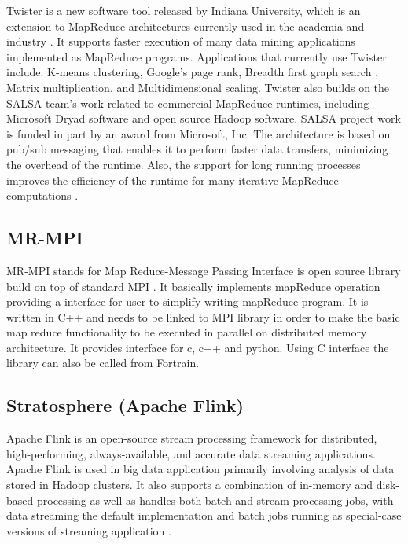      Twister is a new software tool released by Indiana University,
     which is an extension to MapReduce architectures currently used
     in the academia and industry \cite{www-twister1}. It supports
     faster execution of many data mining applications implemented as
     MapReduce programs. Applications that currently use Twister
     include: K-means clustering, Google's page rank, Breadth first
     graph search , Matrix multiplication, and Multidimensional
     scaling. Twister also builds on the SALSA team's work related to
     commercial MapReduce runtimes, including Microsoft Dryad software
     and open source Hadoop software. SALSA project work is funded in
     part by an award from Microsoft, Inc. The architecture is based
     on pub/sub messaging that enables it to perform faster data
     transfers, minimizing the overhead of the runtime. Also, the
     support for long running processes improves the efficiency of the
     runtime for many iterative MapReduce
     computations \cite{www-twister2} \cite{www-twister3}
     \cite{paper-twister}.

     \pv

\subsection{MR-MPI}

     MR-MPI stands for Map Reduce-Message
     Passing Interface is open source library build on top of standard
     MPI \cite{www-mapreducempi}. It basically implements
     mapReduce operation providing a
     interface for user to simplify writing mapReduce program.  It is
     written in C++ and needs to be linked to MPI library in order to
     make the basic map reduce functionality to be executed in
     parallel on distributed memory architecture.  It provides
     interface for c, c++ and python. Using C interface the library
     can also be called from Fortrain.

     \pv

\subsection{Stratosphere (Apache Flink)}
     
     Apache Flink is an open-source stream processing framework for
     distributed, high-performing, always-available, and accurate data
     streaming applications. Apache Flink is used in big data application
     primarily involving analysis of data stored in Hadoop clusters. 
     It also supports a combination of in-memory and disk-based processing
     as well as handles both batch and stream processing jobs, with data
     streaming the default implementation and batch jobs running as 
     special-case versions of streaming application \cite{www-flink}.



